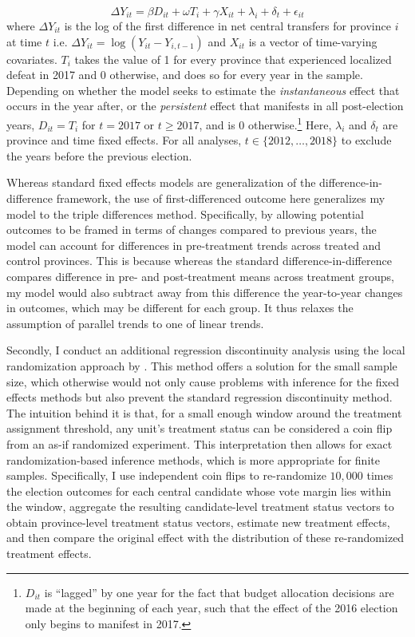 \documentclass[12pt]{article}
\newcommand\fnote[1]{\footnote{\baselineskip=2\normalbaselineskip#1}}
\newcommand{\1}{\mathbbm{1}}
\begin{document}
\begin{equation}
\Delta Y_{it} = \beta D_{it} + \omega T_{i} + \gamma X_{it} + \lambda_i + \delta_t + \epsilon_{it} \label{eq:FE}
\end{equation}
where $\Delta Y_{it}$ is the log of the first difference in net central transfers for province $i$ at time $t$ i.e. $\Delta Y_{it} = \log(Y_{it} - Y_{i, t-1})$ and $X_{it}$ is a vector of time-varying covariates. $T_{i}$ takes the value of 1 for every province that experienced localized defeat in 2017 and 0 otherwise, and does so for every year in the sample. Depending on whether the model seeks to estimate the \textit{instantaneous} effect that occurs in the year after, or the \textit{persistent} effect that manifests in all post-election years, $D_{it} = T_{i}$ for $t=2017$ or $t\geq2017$, and is  $0$ otherwise.\fnote{$D_{it}$ is ``lagged'' by one year for the fact that budget allocation decisions are made at the beginning of each year, such that the effect of the 2016 election only begins to manifest in 2017.} Here, $\lambda_i$ and $\delta_t$ are province and time fixed effects. For all analyses, $t \in \{2012, \ldots, 2018\}$ to exclude the years before the previous election.

Whereas standard fixed effects models are generalization of the difference-in-difference framework, the use of first-differenced outcome here generalizes my model to the triple differences method. Specifically, by allowing potential outcomes to be framed in terms of changes compared to previous years, the model can account for differences in pre-treatment trends across treated and control provinces. This is because whereas the standard difference-in-difference compares difference in pre- and post-treatment means across treatment groups, my model would also subtract away from this difference the year-to-year changes in outcomes, which may be different for each group. It thus relaxes the assumption of parallel trends to one of linear trends.

Secondly, I conduct an additional regression discontinuity analysis using the local randomization approach by \citet{CattaneoTitiunik2015}. This method offers a solution for the small sample size, which otherwise would not only cause problems with inference for the fixed effects methods but also prevent the standard regression discontinuity method. The intuition behind it is that, for a small enough window around the treatment assignment threshold, any unit's treatment status can be considered a coin flip from an as-if randomized experiment. This interpretation then allows for exact randomization-based inference methods, which is more appropriate for finite samples. Specifically, I use independent coin flips to re-randomize $10,000$ times the election outcomes for each central candidate whose vote margin lies within the window, aggregate the resulting candidate-level treatment status vectors to obtain province-level treatment status vectors, estimate new treatment effects, and then compare the original effect with the distribution of these re-randomized treatment effects.
\end{document}

